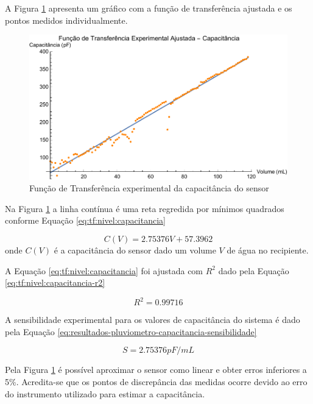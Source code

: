 \documentclass[a4paper]{instrumentacao}
\begin{document}
A Figura \ref{fig:tf:nivel:capacitancia} apresenta um gráfico com a função de transferência ajustada e os pontos medidos individualmente.

\begin{figure}[H]
	\centering \includegraphics[width=\textwidth]{Nivel/Experimental/Capacitancia-Ajuste.pdf}
	\caption{Função de Transferência experimental da capacitância do sensor}
	\label{fig:tf:nivel:capacitancia}
\end{figure}

Na Figura \ref{fig:tf:nivel:capacitancia} a linha contínua é uma reta regredida por mínimos quadrados conforme Equação \ref{eq:tf:nivel:capacitancia}

\begin{equation}
	C(V) = 2.75376 V+57.3962
	\label{eq:tf:nivel:capacitancia}
\end{equation}
\noindent onde $C(V)$ é a capacitância do sensor dado um volume $V$ de água no recipiente.

A Equação \ref{eq:tf:nivel:capacitancia} foi ajustada com $R^2$ dado pela Equação \ref{eq:tf:nivel:capacitancia-r2} 

\begin{equation}
	R^2 = 0.99716
	\label{eq:tf:nivel:capacitancia-r2}
\end{equation}

A sensibilidade experimental para os valores de capacitância do sistema é dado pela Equação \ref{eq:resultados-pluviometro-capacitancia-sensibilidade}

\begin{equation}
	S = 2.75376 pF/mL
	\label{eq:resultados-pluviometro-capacitancia-sensibilidade}
\end{equation}

Pela Figura \ref{fig:tf:nivel:capacitancia} é possível aproximar o sensor como linear e obter erros inferiores a 5\%. Acredita-se que os pontos de discrepância das medidas ocorre devido ao erro do instrumento utilizado para estimar a capacitância.
\end{document}
